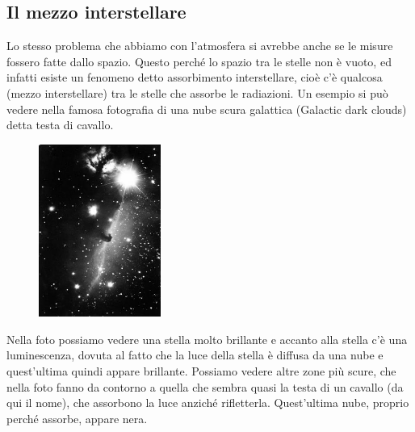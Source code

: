 

\subsection{Il mezzo interstellare}

Lo stesso problema che abbiamo con l'atmosfera si avrebbe anche se le misure fossero fatte dallo spazio. Questo perché lo spazio tra le stelle non è vuoto, ed infatti esiste un fenomeno detto assorbimento interstellare, cioè c'è qualcosa (mezzo interstellare) tra le stelle che assorbe le radiazioni. Un esempio si può vedere nella famosa fotografia di una nube scura galattica (Galactic dark clouds) detta testa di cavallo.

\begin{minipage}{0.495\textwidth}
   \begin{figure}[H]
      \centering
      \includegraphics[width=4cm]{horsehead.jpg}
      \label{fig:horsehead}
  \end{figure}
\end{minipage}
\begin{minipage}{0.5\textwidth}
   \vspace{0.4cm}Nella foto possiamo vedere una stella molto brillante e accanto alla stella c'è una luminescenza, dovuta al fatto che la luce della stella è diffusa da una nube e quest'ultima quindi appare brillante. Possiamo vedere altre zone più scure, che nella foto fanno da contorno a quella che sembra quasi la testa di un cavallo (da qui il nome), che assorbono la luce anziché rifletterla. Quest'ultima nube, proprio perché assorbe, appare nera.
\end{minipage}

